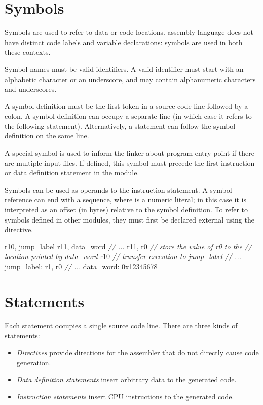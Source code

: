 \documentclass[a4paper,12pt,twoside,extrafontsizes]{memoir}
\begin{document}
\section{Symbols}
\label{sec:symbols}

Symbols are used to refer to data or code locations. \lxp{} assembly language does not have distinct code labels and variable declarations: symbols are used in both these contexts.

Symbol names must be valid identifiers. A valid identifier must start with an alphabetic character or an underscore, and may contain alphanumeric characters and underscores.

A symbol definition must be the first token in a source code line followed by a colon. A symbol definition can occupy a separate line (in which case it refers to the following statement). Alternatively, a statement can follow the symbol definition on the same line.

A special  symbol is used to inform the linker about program entry point if there are multiple input files. If defined, this symbol must precede the first instruction or data definition statement in the module.

Symbols can be used as operands to the  instruction statement. A symbol reference can end with a  sequence, where  is a numeric literal; in this case it is interpreted as an offset (in bytes) relative to the symbol definition. To refer to symbols defined in other modules, they must first be declared external using the  directive.

\begin{codeparbreakable}
     r10, jump\_label
     r11, data\_word
\emph{// ...}
     r11, r0 \emph{// store the value of r0 to the}
               \emph{// location pointed by data\_word}
     r10    \emph{// transfer execution to jump\_label}
\emph{// ...}
jump\_label:
     r1, r0
\emph{// ...}
data\_word:
     0x12345678
\end{codeparbreakable}

\section{Statements}

Each statement occupies a single source code line. There are three kinds of statements:

\begin{itemize}
	\item \emph{Directives} provide directions for the assembler that do not directly cause code generation.
	\item \emph{Data definition statements} insert arbitrary data to the generated code.
	\item \emph{Instruction statements} insert \lxp{} CPU instructions to the generated code.
\end{itemize}
\end{document}

